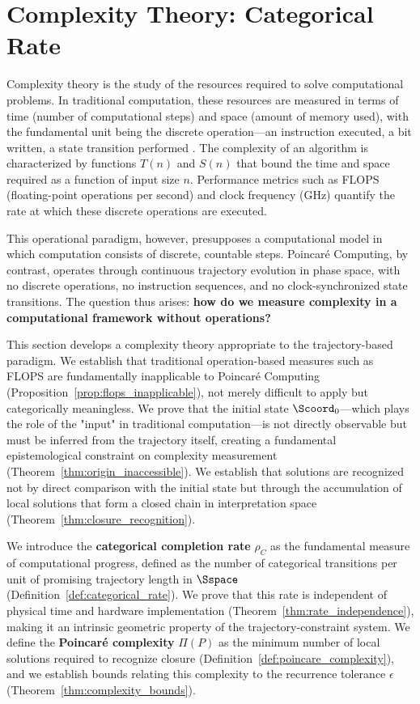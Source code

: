 \section{Complexity Theory: Categorical Rate}
\label{sec:complexity}

Complexity theory is the study of the resources required to solve computational problems. In traditional computation, these resources are measured in terms of time (number of computational steps) and space (amount of memory used), with the fundamental unit being the discrete operation—an instruction executed, a bit written, a state transition performed \citep{arora2009computational}. The complexity of an algorithm is characterized by functions $T(n)$ and $S(n)$ that bound the time and space required as a function of input size $n$. Performance metrics such as FLOPS (floating-point operations per second) and clock frequency (GHz) quantify the rate at which these discrete operations are executed.

This operational paradigm, however, presupposes a computational model in which computation consists of discrete, countable steps. Poincaré Computing, by contrast, operates through continuous trajectory evolution in phase space, with no discrete operations, no instruction sequences, and no clock-synchronized state transitions. The question thus arises: \textbf{how do we measure complexity in a computational framework without operations?}

This section develops a complexity theory appropriate to the trajectory-based paradigm. We establish that traditional operation-based measures such as FLOPS are fundamentally inapplicable to Poincaré Computing (Proposition~\ref{prop:flops_inapplicable}), not merely difficult to apply but categorically meaningless. We prove that the initial state $\Scoord_0$—which plays the role of the "input" in traditional computation—is not directly observable but must be inferred from the trajectory itself, creating a fundamental epistemological constraint on complexity measurement (Theorem~\ref{thm:origin_inaccessible}). We establish that solutions are recognized not by direct comparison with the initial state but through the accumulation of local solutions that form a closed chain in interpretation space (Theorem~\ref{thm:closure_recognition}).

We introduce the \textbf{categorical completion rate} $\rho_C$ as the fundamental measure of computational progress, defined as the number of categorical transitions per unit of promising trajectory length in $\Sspace$ (Definition~\ref{def:categorical_rate}). We prove that this rate is independent of physical time and hardware implementation (Theorem~\ref{thm:rate_independence}), making it an intrinsic geometric property of the trajectory-constraint system. We define the \textbf{Poincaré complexity} $\Pi(P)$ as the minimum number of local solutions required to recognize closure (Definition~\ref{def:poincare_complexity}), and we establish bounds relating this complexity to the recurrence tolerance $\epsilon$ (Theorem~\ref{thm:complexity_bounds}).

